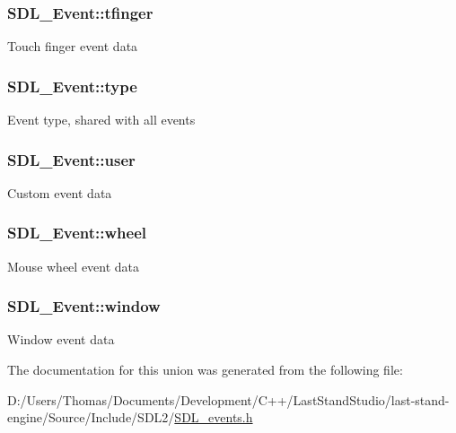 \subsubsection[{tfinger}]{ S\+D\+L\+\_\+\+Event\+::tfinger}\label{unionSDL__Event_ab18d7d60794cb056948ffa58541bc3c5}
Touch finger event data \hypertarget{unionSDL__Event_a237648bec242d2d5835f1a4250ddfa46}{}
\subsubsection[{type}]{ S\+D\+L\+\_\+\+Event\+::type}\label{unionSDL__Event_a237648bec242d2d5835f1a4250ddfa46}
Event type, shared with all events \hypertarget{unionSDL__Event_ab7c394e3ce7bf1e4f8d68bc0e9f1b042}{}
\subsubsection[{user}]{ S\+D\+L\+\_\+\+Event\+::user}\label{unionSDL__Event_ab7c394e3ce7bf1e4f8d68bc0e9f1b042}
Custom event data \hypertarget{unionSDL__Event_a267d3f550715519ec90a81ccd0e6cbda}{}
\subsubsection[{wheel}]{ S\+D\+L\+\_\+\+Event\+::wheel}\label{unionSDL__Event_a267d3f550715519ec90a81ccd0e6cbda}
Mouse wheel event data \hypertarget{unionSDL__Event_a826936b3275406d857bc6654669fae71}{}
\subsubsection[{window}]{ S\+D\+L\+\_\+\+Event\+::window}\label{unionSDL__Event_a826936b3275406d857bc6654669fae71}
Window event data 

The documentation for this union was generated from the following file\+:\begin{DoxyCompactItemize}
\item 
D\+:/\+Users/\+Thomas/\+Documents/\+Development/\+C++/\+Last\+Stand\+Studio/last-\/stand-\/engine/\+Source/\+Include/\+S\+D\+L2/\hyperlink{SDL__events_8h}{S\+D\+L\+\_\+events.\+h}\end{DoxyCompactItemize}
